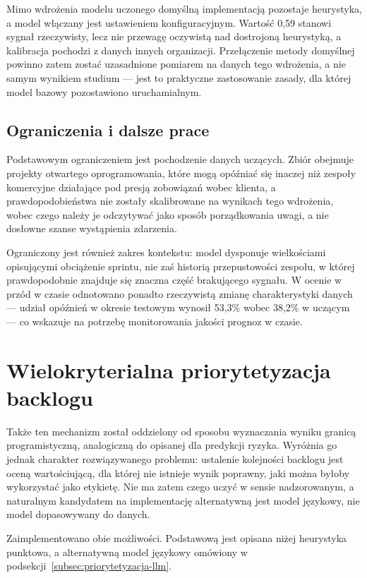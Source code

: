 Mimo wdrożenia modelu uczonego domyślną implementacją pozostaje heurystyka, a model włączany jest ustawieniem konfiguracyjnym. Wartość 0,59 stanowi sygnał rzeczywisty, lecz nie przewagę oczywistą nad dostrojoną heurystyką, a kalibracja pochodzi z danych innych organizacji. Przełączenie metody domyślnej powinno zatem zostać uzasadnione pomiarem na danych tego wdrożenia, a nie samym wynikiem studium — jest to praktyczne zastosowanie zasady, dla której model bazowy pozostawiono uruchamialnym.

\subsection{Ograniczenia i dalsze prace}

Podstawowym ograniczeniem jest pochodzenie danych uczących. Zbiór obejmuje projekty otwartego oprogramowania, które mogą opóźniać się inaczej niż zespoły komercyjne działające pod presją zobowiązań wobec klienta, a prawdopodobieństwa nie zostały skalibrowane na wynikach tego wdrożenia, wobec czego należy je odczytywać jako sposób porządkowania uwagi, a nie dosłowne szanse wystąpienia zdarzenia.

Ograniczony jest również zakres kontekstu: model dysponuje wielkościami opisującymi obciążenie sprintu, nie zaś historią przepustowości zespołu, w której prawdopodobnie znajduje się znaczna część brakującego sygnału. W ocenie w przód w czasie odnotowano ponadto rzeczywistą zmianę charakterystyki danych — udział opóźnień w okresie testowym wynosił 53,3\% wobec 38,2\% w uczącym — co wskazuje na potrzebę monitorowania jakości prognoz w czasie.

\section{Wielokryterialna priorytetyzacja backlogu}

Także ten mechanizm został oddzielony od sposobu wyznaczania wyniku granicą programistyczną, analogiczną do opisanej dla predykcji ryzyka. Wyróżnia go jednak charakter rozwiązywanego problemu: ustalenie kolejności backlogu jest oceną wartościującą, dla której nie istnieje wynik poprawny, jaki można byłoby wykorzystać jako etykietę. Nie ma zatem czego uczyć w sensie nadzorowanym, a naturalnym kandydatem na implementację alternatywną jest model językowy, nie model dopasowywany do danych.

Zaimplementowano obie możliwości. Podstawową jest opisana niżej heurystyka punktowa, a alternatywną model językowy omówiony w podsekcji~\ref{subsec:priorytetyzacja-llm}.

